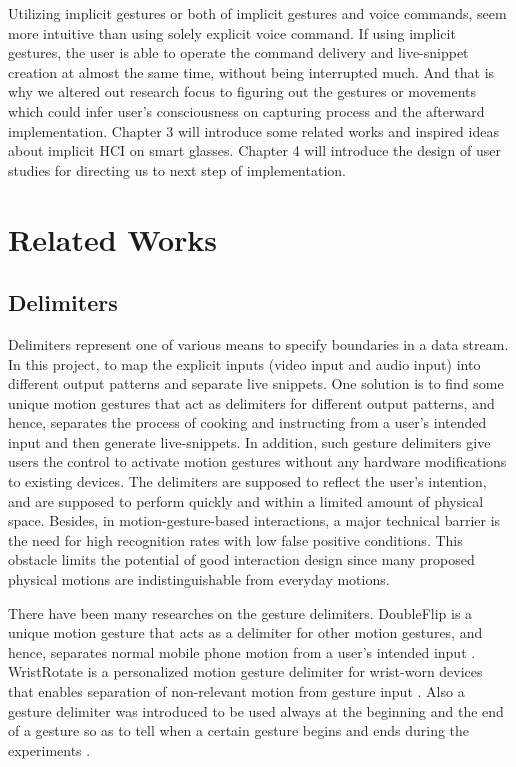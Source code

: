 \documentclass[fyp]{socreport}
\begin{document}
Utilizing implicit gestures or both of implicit gestures and voice commands, seem more intuitive than using solely explicit voice command. If using implicit gestures, the user is able to operate the command delivery and live-snippet creation at almost the same time, without being interrupted much. And that is why we altered out research focus to figuring out the gestures or movements which could infer user’s consciousness on capturing process and the afterward implementation. Chapter 3 will introduce some related works and inspired ideas about implicit HCI on smart glasses. Chapter 4 will introduce the design of user studies for directing us to next step of implementation.

\chapter{Related Works}

\section{Delimiters}
Delimiters represent one of various means to specify boundaries in a data stream. In this project, to map the explicit inputs (video input and audio input) into different output patterns and separate live snippets. One solution is to find some unique motion gestures that act as delimiters for different output patterns, and hence, separates the process of cooking and instructing from a user's intended input and then generate live-snippets. In addition, such gesture delimiters give users the control to activate motion gestures without any hardware modifications to existing devices. The delimiters are supposed to reflect the user's intention, and are supposed to perform quickly and within a limited amount of physical space. Besides, in motion-gesture-based interactions, a major technical barrier is the need for high recognition rates with low false positive conditions. This obstacle limits the potential of good interaction design since many proposed physical motions are indistinguishable from everyday motions.

There have been many researches on the gesture delimiters. DoubleFlip is a unique motion gesture that acts as a delimiter for other motion gestures, and hence, separates normal mobile phone motion from a user’s intended input \cite{ruiz2011doubleflip}. WristRotate is a personalized motion gesture delimiter for wrist-worn devices that enables separation of non-relevant motion from gesture input \cite{kerber2015wristrotate}. Also a gesture delimiter was introduced to be used always at the beginning and the end of a gesture so as to tell when a certain gesture begins and ends during the experiments \cite{liu2004hand}.
\end{document}

